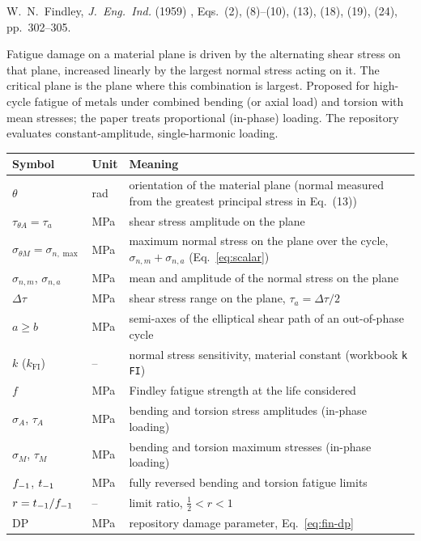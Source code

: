 \label{sheet:FIN}

 W.~N.~Findley, \emph{J.\ Eng.\ Ind.} (1959) \cite{findley1959}, Eqs.~(2), (8)--(10),
(13), (18), (19), (24), pp.~302--305.

 Fatigue damage on a material plane is driven by the alternating shear stress
on that plane, increased linearly by the largest normal stress acting on it. The critical plane is
the plane where this combination is largest. Proposed for high-cycle fatigue of metals under
combined bending (or axial load) and torsion with mean stresses; the paper treats proportional
(in-phase) loading. The repository evaluates constant-amplitude, single-harmonic loading.

\begin{center}\small
\begin{tabular}{@{}llp{100mm}@{}}
\toprule
Symbol & Unit & Meaning\\\midrule
$\theta$ & rad & orientation of the material plane (normal measured from the greatest principal stress in Eq.~(13))\\
$\tau_{\theta A}=\tau_a$ & MPa & shear stress amplitude on the plane\\
$\sigma_{\theta M}=\sigma_{n,\max}$ & MPa & maximum normal stress on the plane over the cycle, $\sigma_{n,m}+\sigma_{n,a}$ (Eq.~\eqref{eq:scalar})\\
$\sigma_{n,m}$, $\sigma_{n,a}$ & MPa & mean and amplitude of the normal stress on the plane\\
$\Delta\tau$ & MPa & shear stress range on the plane, $\tau_a=\Delta\tau/2$\\
$a\ge b$ & MPa & semi-axes of the elliptical shear path of an out-of-phase cycle\\
$k$ ($k_\mathrm{FI}$) & -- & normal stress sensitivity, material constant (workbook \texttt{k FI})\\
$f$ & MPa & Findley fatigue strength at the life considered\\
$\sigma_A$, $\tau_A$ & MPa & bending and torsion stress amplitudes (in-phase loading)\\
$\sigma_M$, $\tau_M$ & MPa & bending and torsion maximum stresses (in-phase loading)\\
$f_{-1}$, $t_{-1}$ & MPa & fully reversed bending and torsion fatigue limits\\
$r=t_{-1}/f_{-1}$ & -- & limit ratio, $\tfrac12<r<1$\\
$\mathrm{DP}$ & MPa & repository damage parameter, Eq.~\eqref{eq:fin-dp}\\
\bottomrule
\end{tabular}
\end{center}

